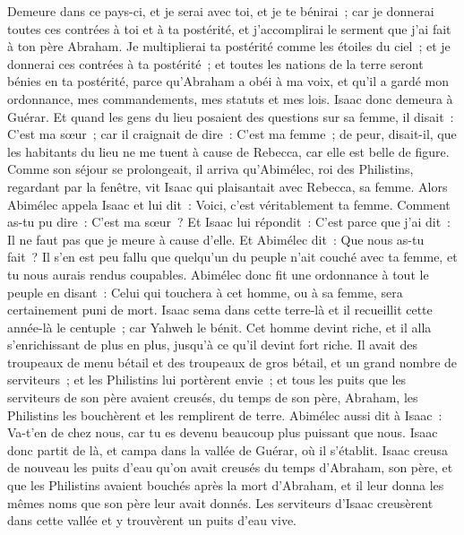 \begin{multicols}{2}
Demeure dans ce pays-ci, et je serai avec toi, et je te bénirai~; car je donnerai toutes ces contrées à toi et à ta postérité, et j'accomplirai le serment que j'ai fait à ton père Abraham.
Je multiplierai ta postérité comme les étoiles du ciel~; et je donnerai ces contrées à ta postérité~; et toutes les nations de la terre seront bénies en ta postérité,
parce qu'Abraham a obéi à ma voix, et qu'il a gardé mon ordonnance, mes commandements, mes statuts et mes lois.
Isaac donc demeura à Guérar.
Et quand les gens du lieu posaient des questions sur sa femme, il disait~: C'est ma sœur~; car il craignait de dire~: C'est ma femme~; de peur, disait-il, que les habitants du lieu ne me tuent à cause de Rebecca, car elle est belle de figure.
Comme son séjour se prolongeait, il arriva qu'Abimélec, roi des Philistins, regardant par la fenêtre, vit Isaac qui plaisantait avec Rebecca, sa femme.
Alors Abimélec appela Isaac et lui dit~: Voici, c'est véritablement ta femme. Comment as-tu pu dire~: C'est ma sœur~? Et Isaac lui répondit~: C'est parce que j'ai dit~: Il ne faut pas que je meure à cause d'elle.
Et Abimélec dit~: Que nous as-tu fait~? Il s'en est peu fallu que quelqu'un du peuple n'ait couché avec ta femme, et tu nous aurais rendus coupables.
Abimélec donc fit une ordonnance à tout le peuple en disant~: Celui qui touchera à cet homme, ou à sa femme, sera certainement puni de mort.
Isaac sema dans cette terre-là et il recueillit cette année-là le centuple~; car Yahweh le bénit.
Cet homme devint riche, et il alla s'enrichissant de plus en plus, jusqu'à ce qu'il devint fort riche.
Il avait des troupeaux de menu bétail et des troupeaux de gros bétail, et un grand nombre de serviteurs~; et les Philistins lui portèrent envie~;
et tous les puits que les serviteurs de son père avaient creusés, du temps de son père, Abraham, les Philistins les bouchèrent et les remplirent de terre.
Abimélec aussi dit à Isaac~: Va-t'en de chez nous, car tu es devenu beaucoup plus puissant que nous.
Isaac donc partit de là, et campa dans la vallée de Guérar, où il s'établit.
Isaac creusa de nouveau les puits d'eau qu'on avait creusés du temps d'Abraham, son père, et que les Philistins avaient bouchés après la mort d'Abraham, et il leur donna les mêmes noms que son père leur avait donnés.
Les serviteurs d'Isaac creusèrent dans cette vallée et y trouvèrent un puits d'eau vive.

\end{multicols}

